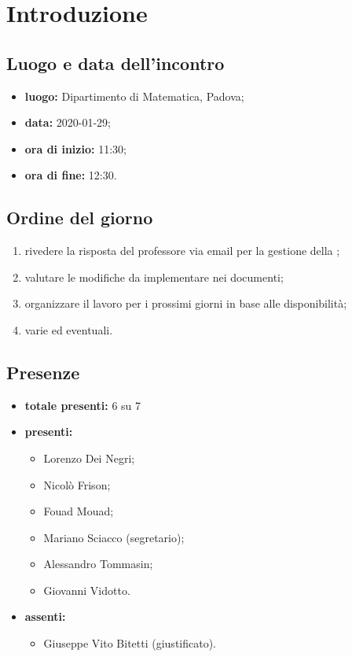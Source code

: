 \section*{Introduzione}

\subsection*{Luogo e data dell'incontro}
	\begin{itemize}
		\item \textbf{luogo:} Dipartimento di Matematica, Padova;
		\item \textbf{data:} 2020-01-29;
		\item \textbf{ora di inizio:} 11:30;
		\item \textbf{ora di fine:} 12:30.
	\end{itemize}

\subsection*{Ordine del giorno}
	\begin{enumerate}
			\item rivedere la risposta del professore via email per la gestione della ;
  			\item valutare le modifiche da implementare nei documenti;
  			\item organizzare il lavoro per i prossimi giorni in base alle disponibilità;
  			\item varie ed eventuali.
	\end{enumerate}

\subsection*{Presenze}
	\begin{itemize}
		\item \textbf{totale presenti:} 6 su 7
		\item \textbf{presenti: }
			\begin{itemize}
				\item Lorenzo Dei Negri;
				\item Nicolò Frison;
				\item Fouad Mouad;
				\item Mariano Sciacco (segretario);
				\item Alessandro Tommasin;
				\item Giovanni Vidotto.
			\end{itemize}
		\item \textbf{assenti: }
			\begin{itemize}
				\item Giuseppe Vito Bitetti (giustificato).
			\end{itemize}
	\end{itemize}


